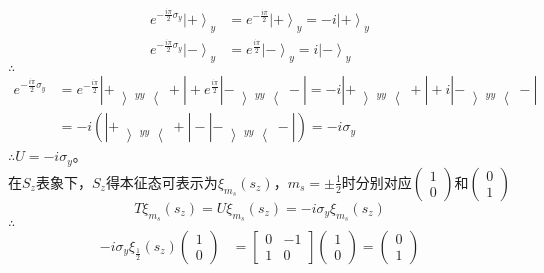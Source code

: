 \documentclass[12pt]{article}
\numberwithin{equation}{section}	 %
\begin{document}
\begin{spacing}{1.5}
\begin{equation}
\begin{aligned}
e^{-\frac{i\pi}{2} \sigma_{y}} \left|+\right>_{y} &= e^{-\frac{i\pi}{2}} \left|+\right>_{y} = -i \left|+\right>_{y}\\
e^{-\frac{i\pi}{2} \sigma_{y}} \left|-\right>_{y} &= e^{\frac{i\pi}{2}} \left|-\right>_{y} = i \left|-\right>_{y}
\end{aligned}
\end{equation}
$\therefore$
\begin{equation}
\begin{aligned}
e^{-\frac{i\pi}{2} \sigma_{y}} &= e^{-\frac{i\pi}{2}}\left|+\left>_{yy}\right<+\right| + e^{\frac{i\pi}{2}}\left|-\left>_{yy}\right<-\right| = -i\left|+\left>_{yy}\right<+\right| + i\left|-\left>_{yy}\right<-\right|\\
&= -i(\left|+\left>_{yy}\right<+\right| - \left|-\left>_{yy}\right<-\right|) = -i\sigma_{y}
\end{aligned}
\end{equation}
$\therefore U=-i\sigma_{y}$。\\
在$S_{z}$表象下，$S_{z}$得本征态可表示为$\xi_{m_{s}}(s_{z})$，$\displaystyle m_{s} = \pm\frac{1}{2}$时分别对应$\begin{pmatrix} 1 \\ 0 \end{pmatrix}$和$\begin{pmatrix} 0 \\ 1 \end{pmatrix}$
\begin{equation}
T\xi_{m_{s}}(s_{z}) = U\xi_{m_{s}}(s_{z}) = -i\sigma_{y}\xi_{m_{s}}(s_{z})
\end{equation}
$\therefore$
\begin{equation}
\begin{aligned}
-i\sigma_{y}\xi_{\frac{1}{2}}(s_{z})\begin{pmatrix} 1 \\ 0  \end{pmatrix} &= \begin{bmatrix} 0 & -1 \\ 1 & 0 \end{bmatrix} \begin{pmatrix} 1 \\ 0 \end{pmatrix} = \begin{pmatrix} 0 \\ 1 \end{pmatrix} \\

\end{aligned}
\end{equation}
\end{spacing}
\end{document}
